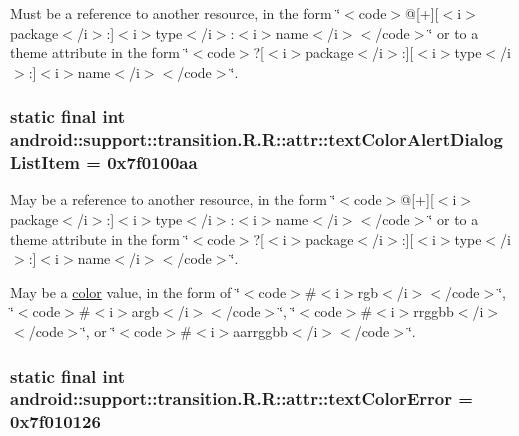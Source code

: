 Must be a reference to another resource, in the form \char`\"{}$<$code$>$@\mbox{[}+\mbox{]}\mbox{[}$<$i$>$package$<$/i$>$:\mbox{]}$<$i$>$type$<$/i$>$:$<$i$>$name$<$/i$>$$<$/code$>$\char`\"{} or to a theme attribute in the form \char`\"{}$<$code$>$?\mbox{[}$<$i$>$package$<$/i$>$:\mbox{]}\mbox{[}$<$i$>$type$<$/i$>$:\mbox{]}$<$i$>$name$<$/i$>$$<$/code$>$\char`\"{}. \hypertarget{classandroid_1_1support_1_1transition_1_1_r_1_1attr_581d35c098ed10058a01bb5f9ac0d331}{
\subsubsection[{textColorAlertDialogListItem}]{\setlength{\rightskip}{0pt plus 5cm}static final int android::support::transition.R.R::attr::textColorAlertDialogListItem = 0x7f0100aa}}
\label{classandroid_1_1support_1_1transition_1_1_r_1_1attr_581d35c098ed10058a01bb5f9ac0d331}


May be a reference to another resource, in the form \char`\"{}$<$code$>$@\mbox{[}+\mbox{]}\mbox{[}$<$i$>$package$<$/i$>$:\mbox{]}$<$i$>$type$<$/i$>$:$<$i$>$name$<$/i$>$$<$/code$>$\char`\"{} or to a theme attribute in the form \char`\"{}$<$code$>$?\mbox{[}$<$i$>$package$<$/i$>$:\mbox{]}\mbox{[}$<$i$>$type$<$/i$>$:\mbox{]}$<$i$>$name$<$/i$>$$<$/code$>$\char`\"{}. 

May be a \hyperlink{classandroid_1_1support_1_1transition_1_1_r_1_1color}{color} value, in the form of \char`\"{}$<$code$>$\#$<$i$>$rgb$<$/i$>$$<$/code$>$\char`\"{}, \char`\"{}$<$code$>$\#$<$i$>$argb$<$/i$>$$<$/code$>$\char`\"{}, \char`\"{}$<$code$>$\#$<$i$>$rrggbb$<$/i$>$$<$/code$>$\char`\"{}, or \char`\"{}$<$code$>$\#$<$i$>$aarrggbb$<$/i$>$$<$/code$>$\char`\"{}. \hypertarget{classandroid_1_1support_1_1transition_1_1_r_1_1attr_48fa07ac4e89de1f93012eec85241bd5}{
\subsubsection[{textColorError}]{\setlength{\rightskip}{0pt plus 5cm}static final int android::support::transition.R.R::attr::textColorError = 0x7f010126}}
\label{classandroid_1_1support_1_1transition_1_1_r_1_1attr_48fa07ac4e89de1f93012eec85241bd5}


